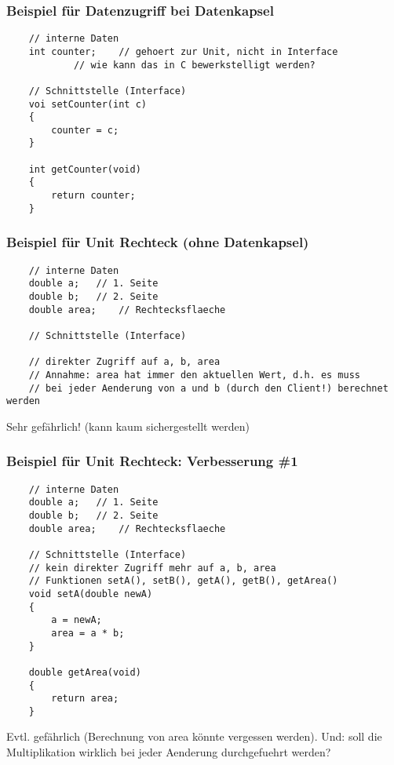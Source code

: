 \subsubsection{Beispiel für Datenzugriff bei Datenkapsel\hfill}
\label{sec:Beispiel fuer Datenzugriff bei Datenkapsel}
\noindent
\begin{minipage}{\linewidth}
	\begin{lstlisting}
	// interne Daten
	int counter;	// gehoert zur Unit, nicht in Interface
			// wie kann das in C bewerkstelligt werden?
		
	// Schnittstelle (Interface)
	voi setCounter(int c)
	{
		counter = c;
	}
	
	int getCounter(void)
	{
		return counter;
	}
	\end{lstlisting}
\end{minipage}

\subsubsection{Beispiel für Unit Rechteck (ohne Datenkapsel)\hfill}
\label{sec:Beispiel fuer Unit Rechteck (ohne Datenkapsel)}
\noindent
\begin{minipage}{\linewidth}
	\begin{lstlisting}
	// interne Daten
	double a;	// 1. Seite
	double b;	// 2. Seite
	double area;	// Rechtecksflaeche
	
	// Schnittstelle (Interface)
	
	// direkter Zugriff auf a, b, area
	// Annahme: area hat immer den aktuellen Wert, d.h. es muss
	// bei jeder Aenderung von a und b (durch den Client!) berechnet werden
	\end{lstlisting}
\end{minipage}
\begin{achtung}
	Sehr gefährlich! (kann kaum sichergestellt werden)
\end{achtung}

\subsubsection{Beispiel für Unit Rechteck: Verbesserung \#1}
\label{sec:Beispiel fuer Unit Rechteck: Verbesserung 1}
\noindent
\begin{minipage}{\linewidth}
	\begin{lstlisting}
	// interne Daten
	double a;	// 1. Seite
	double b;	// 2. Seite
	double area;	// Rechtecksflaeche
	
	// Schnittstelle (Interface)
	// kein direkter Zugriff mehr auf a, b, area
	// Funktionen setA(), setB(), getA(), getB(), getArea()
	void setA(double newA)
	{
		a = newA;
		area = a * b;
	}
	
	double getArea(void)
	{
		return area;
	}
	\end{lstlisting}
\end{minipage}
\begin{hinweis}
	Evtl. gefährlich (Berechnung von area könnte vergessen werden). Und: soll die Multiplikation wirklich bei jeder Aenderung durchgefuehrt werden?
\end{hinweis}

